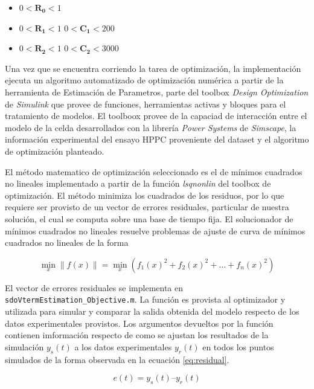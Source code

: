 \documentclass[10pt,a4paper]{article}
\begin{document}
\begin{itemize}
    \item [] $ 0 < \mathbf{R_0} < 1$
    \item [] $ 0 < \mathbf{R_1} < 1$ $ 0 < \mathbf{C_1} < 200$
    \item [] $ 0 < \mathbf{R_2} < 1$ $ 0 < \mathbf{C_2} < 3000$
\end{itemize}
\FloatBarrier

Una vez que se encuentra corriendo la tarea de optimización, la implementación
ejecuta un algoritmo automatizado de optimización numérica a partir de la
herramienta de Estimación de Parametros, parte del toolbox \emph{Design
Optimization} de \emph{Simulink} que provee de funciones, herramientas activas
y bloques para el tratamiento de modelos. El toolboox provee de la capaciad de
interacción entre el modelo de la celda desarrollados con la librer\'ia
\emph{Power Systems} de \emph{Simscape}, la información experimental del ensayo
\acrshort{HPPC} proveniente del dataset y el algoritmo de optimización planteado.

El método matematico de optimización seleccionado es el de mínimos cuadrados no
lineales implementado a partir de la función \emph{lsqnonlin} del toolbox de
optimización. 
El método minimiza los cuadrados de los residuos, por lo que requiere ser
provisto de un vector de errores residuales, particular de nuestra solución, el
cual se computa sobre una base de tiempo fija.
El solucionador de mínimos cuadrados no lineales resuelve problemas de ajuste de
curva de mínimos cuadrados no lineales de la forma

\begin{equation}
    \min_{x}\|f(x)\| = \min_{x} (f_1(x)^2 + f_2(x)^2+\dots+f_n(x)^2)
\end{equation}

El vector de errores residuales se implementa en
\texttt{sdoVtermEstimation\_Objective.m}. La función es provista al optimizador y
utilizada para simular y comparar la salida obtenida del modelo respecto de los
datos experimentales provistos. Los argumentos devueltos por la función
contienen imformación respecto de como se ajustan los resultados de la
simulación $y_{s}(t)$ a los datos experimentales $y_{r}(t)$ en todos los puntos
simulados de la forma observada en la ecuación \ref{eq:residual}.

\begin{equation}
    e(t) = y_{s}(t)–y_{r}(t) 
    \label{eq:residual}
\end{equation}
\end{document}
